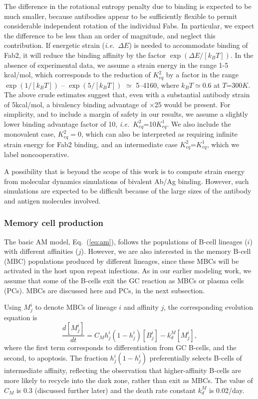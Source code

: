 \documentclass[utf8]{frontiersHLTH}%
\newcommand{\td}[2]{\frac{d {#1}}{d {#2}}}
\def\ie {{\it i.e.}}
\newcommand{\eq}[1] {Eq.~(\ref{eq:#1})}
\begin{document}
The difference in the rotational entropy penalty due to binding is
expected to be much smaller, because antibodies appear to be sufficiently
flexible to permit considerable independent rotation of the individual
Fabs.\cite{saphire01} In particular, we expect the difference to be less
than an order of magnitude, and neglect this contribution.
If energetic strain (\ie~$\Delta E$) is needed to accommodate binding of Fab2, it will reduce the
binding affinity by the factor $\exp(\Delta E/[k_BT])$. In the absence of experimental data,
we assume a strain energy in the range 1-5 kcal/mol, which corresponds to the
reduction of $K^2_{eq}$ by a factor in the range $\exp(1/[k_BT])$ -- $\exp(5/[k_BT])$
$\simeq$ 5--4160, where $k_BT\simeq0.6$ at $T$=$300K$.
The above crude estimates suggest that, even with a substantial antibody strain of 5kcal/mol,
a bivalency binding advantage of $\times$25 would be present.
For simplicity, and to include a margin of safety in our results, we assume a slightly lower binding advantage factor of 10,
\ie~$K^2_{eq}$=10$K^1_{eq}$.  We also include the monovalent
case, $K^2_{eq}=0$, which can also be interpreted as requiring infinite strain
energy for Fab2 binding, and an intermediate case $K^2_{eq}$=$K^1_{eq}$, which we label noncooperative.

A possibility that is beyond the scope of this work is to
compute strain energy from molecular dynamics simulations of bivalent Ab/Ag binding. However, such simulations
are expected to be difficult because of the large sizes of the antibody and antigen molecules involved.

\subsubsection{Memory cell production}
The basic AM model, \eq{am}, follows the populations of B-cell lineages ($i$) with
different affinities ($j$). However, we are also interested in the memory
B-cell (MBC) populations produced by different lineages, since these MBCs
will be activated in the host upon repeat infections. As in our earlier
modeling work,\cite{ovchinnikov18} we assume that some of the B-cells
exit the GC reaction as MBCs or plasma cells (PCs).  MBCs are discussed
here and PCs, in the next subsection.

Using $M^i_j$ to denote MBCs
of lineage $i$ and affinity $j$, the corresponding evolution equation is
\begin{equation}
 \td{[M^i_j]}{t} = C_{M} h^i_j(1-h^i_j)[B^i_j] - k^M_d [M^i_j],
 \label{eq:mbc}
\end{equation}
where the first term corresponds to differentiation from GC B-cells, and
the second, to apoptosis. The fraction $h^i_j(1-h^i_j)$ preferentially
selects B-cells of intermediate affinity, reflecting the observation that
higher-affinity B-cells are more likely to recycle into the dark zone, rather
than exit as MBCs.\cite{ise19}
The value of $C_M$ is 0.3 (discussed further later) and the death rate
constant $k^M_d$ is 0.02/day\cite{rundell98}.
\end{document}

